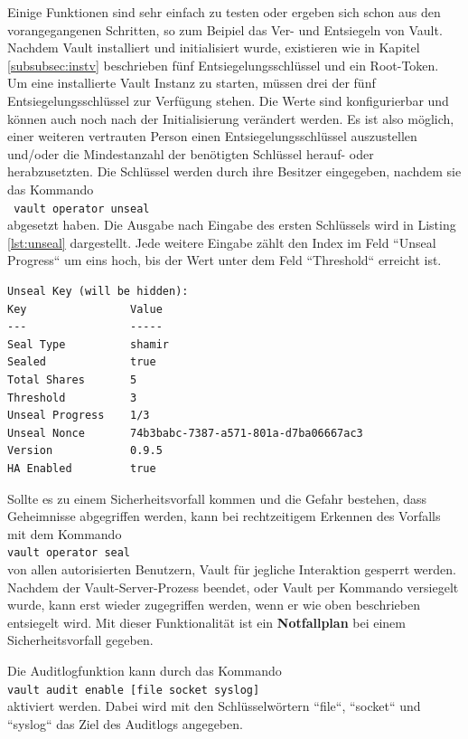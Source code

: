 \documentclass[
book,
a4paper,   
titlepage,  
halfparskip,
12pt        
]{scrartcl}
\newcommand\inline{\lstinline[basicstyle=\ttfamily]}
\begin{document}
\begin{onehalfspacing}
Einige Funktionen sind sehr einfach zu testen oder ergeben sich schon aus den vorangegangenen Schritten, so zum Beipiel das Ver- und Entsiegeln von Vault. Nachdem Vault installiert und initialisiert wurde, existieren wie in Kapitel \vref{subsubsec:instv} beschrieben fünf Entsiegelungsschlüssel und ein Root-Token. Um eine installierte Vault Instanz zu starten, müssen drei der fünf Entsiegelungsschlüssel zur Verfügung stehen. Die Werte sind konfigurierbar und können auch noch nach der Initialisierung verändert werden. Es ist also möglich, einer weiteren vertrauten Person einen Entsiegelungsschlüssel auszustellen und/oder die Mindestanzahl der benötigten Schlüssel herauf- oder herabzusetzten. Die Schlüssel werden durch ihre Besitzer eingegeben, nachdem sie das Kommando\\\inline| vault operator unseal|\\abgesetzt haben. Die Ausgabe nach Eingabe des ersten Schlüssels wird in Listing \vref{lst:unseal} dargestellt. Jede weitere Eingabe zählt den Index im Feld ``Unseal Progress`` um eins hoch, bis der Wert unter dem Feld ``Threshold`` erreicht ist. 
\begin{lstlisting}[caption={[Entsiegelungsprozess] Erster Schritt im Entsiegelungsprozess von Vault}, label=lst:unseal, captionpos=b, basicstyle=\ttfamily] 
Unseal Key (will be hidden): 
Key                Value
---                -----
Seal Type          shamir
Sealed             true
Total Shares       5
Threshold          3
Unseal Progress    1/3
Unseal Nonce       74b3babc-7387-a571-801a-d7ba06667ac3
Version            0.9.5
HA Enabled         true
\end{lstlisting}
Sollte es zu einem Sicherheitsvorfall kommen und die Gefahr bestehen, dass Geheimnisse abgegriffen werden, kann bei rechtzeitigem Erkennen des Vorfalls mit dem Kommando\\\inline|vault operator seal|\\von allen autorisierten Benutzern, Vault für jegliche Interaktion gesperrt werden. Nachdem der Vault-Server-Prozess beendet, oder Vault per Kommando versiegelt wurde, kann erst wieder zugegriffen werden, wenn er wie oben beschrieben entsiegelt wird. Mit dieser Funktionalität ist ein \textbf{Notfallplan} bei einem Sicherheitsvorfall gegeben.

Die Auditlogfunktion kann durch das Kommando\\\inline|vault audit enable [file socket syslog]|\\aktiviert werden. Dabei wird mit den Schlüsselwörtern ``file``, ``socket`` und ``syslog`` das Ziel des Auditlogs angegeben.


\end{onehalfspacing}
\end{document}
